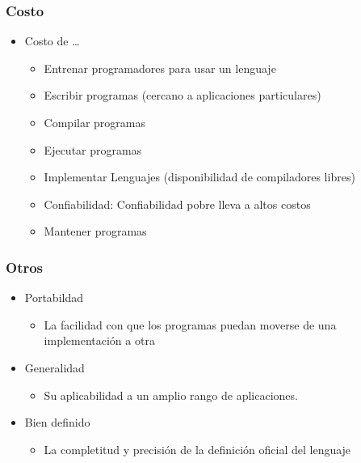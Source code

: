 \documentclass[11pt]{article}
\begin{document}
\subsubsection*{Costo}
\label{sec:orgheadline6}
\begin{itemize}
\item Costo de \ldots{}
\begin{itemize}
\item Entrenar programadores para usar un lenguaje
\item Escribir programas (cercano a aplicaciones particulares)
\item Compilar programas
\item Ejecutar programas
\item Implementar Lenguajes (disponibilidad de compiladores libres)
\item Confiabilidad: Confiabilidad pobre lleva a altos costos
\item Mantener programas
\end{itemize}
\end{itemize}

\subsubsection*{Otros}
\label{sec:orgheadline7}
\begin{itemize}
\item Portabildad
\begin{itemize}
\item La facilidad con que los programas puedan moverse de una
implementación a otra
\end{itemize}
\item Generalidad
\begin{itemize}
\item Su aplicabilidad a un amplio rango de aplicaciones.
\end{itemize}
\item Bien definido
\begin{itemize}
\item La completitud y precisión de la definición oficial del lenguaje
\end{itemize}
\end{itemize}
\end{document}
